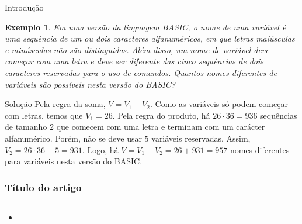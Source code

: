 \documentclass[aspectratio=169,t,xcolor=table]{beamer}
\newtheorem{ex}{Exemplo}
\begin{document}
\begin{frame}{Introdução}

    \footnotesize
    
    \begin{ex}
        Em uma versão da linguagem BASIC, o nome de uma variável é uma sequência de um ou dois caracteres alfanuméricos, em que letras maiúsculas e minúsculas não são distinguidas. Além disso, um nome de variável deve começar com uma letra e deve ser diferente das cinco sequências de dois caracteres reservadas para o uso de comandos. Quantos nomes diferentes de variáveis são possíveis nesta versão do BASIC?
    \end{ex}
    
    \begin{block}{Solução}
        Pela regra da soma, $V=V_1+V_2$. Como as variáveis só podem começar com letras, temos que $V_1=26$. Pela regra do produto, há $26\cdot 36=936$ sequências de tamanho $2$ que comecem com uma letra e terminam com um carácter alfanumérico. Porém, não se deve usar $5$ variáveis reservadas. Assim, $V_2=26\cdot 36-5=931$. Logo, há $V=V_1+V_2 = 26+931=957$ nomes diferentes para variáveis nesta versão do BASIC.
    \end{block}

\end{frame}
\def\artigo{Título do artigo}

\begin{frame}
	\frametitle{\artigo}
	\begin{columns}
		\begin{column}{.52\textwidth}%
\begin{itemize}
 \item {}
\end{itemize}
\end{column}
		\begin{column}{.52\textwidth}%
\begin{figure}
\label{fig:astm}
\end{figure}
		\end{column}
	\end{columns}
\end{frame}
\end{document}
